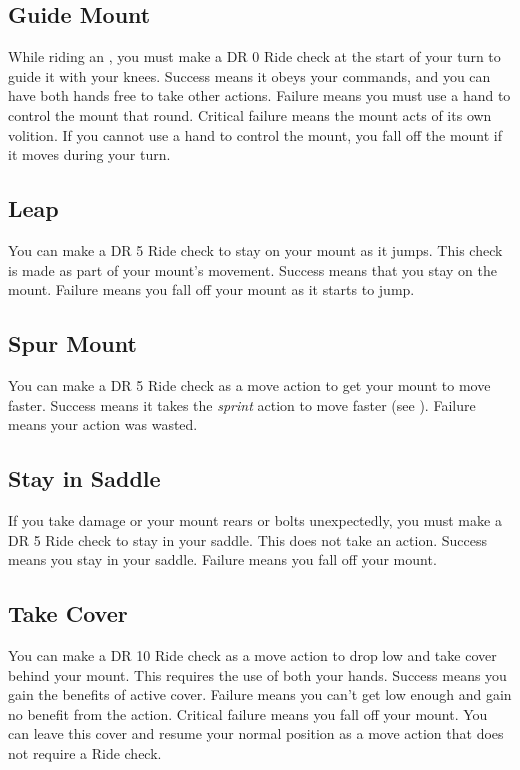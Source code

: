     \subsection{Guide Mount}
        While riding an , you must make a DR 0 Ride check at the start of your turn to guide it with your knees. Success means it obeys your commands, and you can have both hands free to take other actions. Failure means you must use a hand to control the mount that round. Critical failure means the mount acts of its own volition. If you cannot use a hand to control the mount, you fall off the mount if it moves during your turn.

    \subsection{Leap}
        You can make a DR 5 Ride check to stay on your mount as it jumps. This check is made as part of your mount's movement. Success means that you stay on the mount. Failure means you fall off your mount as it starts to jump.

    \subsection{Spur Mount}
        You can make a DR 5 Ride check as a move action to get your mount to move faster. Success means it takes the \textit{sprint} action to move faster (see ).
        Failure means your action was wasted.

    \subsection{Stay in Saddle}
        If you take damage or your mount rears or bolts unexpectedly, you must make a DR 5 Ride check to stay in your saddle. This does not take an action. Success means you stay in your saddle. Failure means you fall off your mount.

    \subsection{Take Cover}
        You can make a DR 10 Ride check as a move action to drop low and take cover behind your mount. This requires the use of both your hands. Success means you gain the benefits of active cover. Failure means you can't get low enough and gain no benefit from the action. Critical failure means you fall off your mount. You can leave this cover and resume your normal position as a move action that does not require a Ride check.

